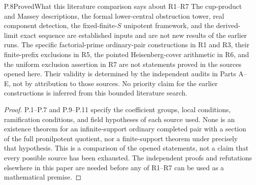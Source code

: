 \begin{result}{P.8}{Proved}{What this literature comparison says about R1--R7}
The cup-product and Massey descriptions, the formal lower-central
obstruction tower, real component detection, the fixed-finite-\(S\)
unipotent framework, and the derived-limit exact sequence are established
inputs and are not new results of the earlier runs. The specific
factorial-prime ordinary-pair constructions in R1 and R3, their
finite-prefix exclusions in R5, the pointed Heisenberg-cover arithmetic
in R6, and the uniform exclusion assertion in R7 are not statements
proved in the sources opened here. Their validity is determined by the
independent audits in Parts A--E, not by attribution to those sources.
No priority claim for the earlier constructions is inferred from this
bounded literature search.
\end{result}
\begin{proof}
P.1--P.7 and P.9--P.11 specify the coefficient groups, local conditions, ramification
conditions, and field hypotheses of each source used. None is an
existence theorem for an infinite-support ordinary completed pair with
a section of the full pronilpotent quotient, nor a finite-support theorem
under precisely that hypothesis. This is a comparison of the opened
statements, not a claim that every possible source has been exhausted.
The independent proofs and refutations elsewhere in this paper are needed
before any of R1--R7 can be used as a mathematical premise.
\end{proof}

